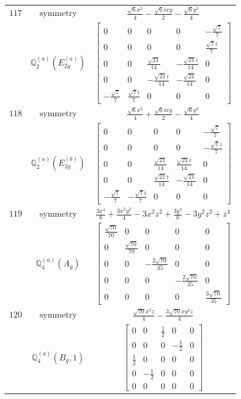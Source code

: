 \documentclass[fleqn,8pt,landscape]{jsarticle}
\begin{document}
\begin{longtable}{ccc}
$ 117 $ & $ \text{symmetry} $ & $ \frac{\sqrt{6} x^{2}}{4} - \frac{\sqrt{6} i x y}{2} - \frac{\sqrt{6} y^{2}}{4} $ \\
$  $ & $ \mathbb{Q}_{2}^{(a)}(E_{2g}^{(a)}) $ & $ \begin{bmatrix} 0 & 0 & 0 & 0 & - \frac{\sqrt{7}}{7} \\ 0 & 0 & 0 & 0 & \frac{\sqrt{7} i}{7} \\ 0 & 0 & \frac{\sqrt{21}}{14} & - \frac{\sqrt{21} i}{14} & 0 \\ 0 & 0 & - \frac{\sqrt{21} i}{14} & - \frac{\sqrt{21}}{14} & 0 \\ - \frac{\sqrt{7}}{7} & \frac{\sqrt{7} i}{7} & 0 & 0 & 0 \end{bmatrix} $ \\ \hline
$ 118 $ & $ \text{symmetry} $ & $ \frac{\sqrt{6} x^{2}}{4} + \frac{\sqrt{6} i x y}{2} - \frac{\sqrt{6} y^{2}}{4} $ \\
$  $ & $ \mathbb{Q}_{2}^{(a)}(E_{2g}^{(b)}) $ & $ \begin{bmatrix} 0 & 0 & 0 & 0 & - \frac{\sqrt{7}}{7} \\ 0 & 0 & 0 & 0 & - \frac{\sqrt{7} i}{7} \\ 0 & 0 & \frac{\sqrt{21}}{14} & \frac{\sqrt{21} i}{14} & 0 \\ 0 & 0 & \frac{\sqrt{21} i}{14} & - \frac{\sqrt{21}}{14} & 0 \\ - \frac{\sqrt{7}}{7} & - \frac{\sqrt{7} i}{7} & 0 & 0 & 0 \end{bmatrix} $ \\ \hline
$ 119 $ & $ \text{symmetry} $ & $ \frac{3 x^{4}}{8} + \frac{3 x^{2} y^{2}}{4} - 3 x^{2} z^{2} + \frac{3 y^{4}}{8} - 3 y^{2} z^{2} + z^{4} $ \\
$  $ & $ \mathbb{Q}_{4}^{(a)}(A_{g}) $ & $ \begin{bmatrix} \frac{\sqrt{70}}{70} & 0 & 0 & 0 & 0 \\ 0 & \frac{\sqrt{70}}{70} & 0 & 0 & 0 \\ 0 & 0 & - \frac{2 \sqrt{70}}{35} & 0 & 0 \\ 0 & 0 & 0 & - \frac{2 \sqrt{70}}{35} & 0 \\ 0 & 0 & 0 & 0 & \frac{3 \sqrt{70}}{35} \end{bmatrix} $ \\ \hline
$ 120 $ & $ \text{symmetry} $ & $ \frac{\sqrt{70} x^{3} z}{4} - \frac{3 \sqrt{70} x y^{2} z}{4} $ \\
$  $ & $ \mathbb{Q}_{4}^{(a)}(B_{g},1) $ & $ \begin{bmatrix} 0 & 0 & \frac{1}{2} & 0 & 0 \\ 0 & 0 & 0 & - \frac{1}{2} & 0 \\ \frac{1}{2} & 0 & 0 & 0 & 0 \\ 0 & - \frac{1}{2} & 0 & 0 & 0 \\ 0 & 0 & 0 & 0 & 0 \end{bmatrix} $ \\ \hline

\end{longtable}
\end{document}
